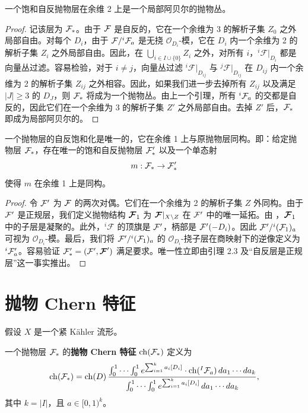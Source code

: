 \begin{lemma}
一个饱和自反抛物层在余维 2 上是一个局部阿贝尔的抛物丛。
\end{lemma}

\begin{proof}
记该层为 \(\mathcal{F}_{*}\)。由于 \(\mathcal{F}\) 是自反的，它在一个余维为 3 的解析子集 \(Z_0\) 之外局部自由。对每个 \(D_i\)，由于 \(\mathcal{F}/{}^i\mathcal{F}_a\) 是无挠 \(\mathcal O_{D_i}\)-模，它在 \(D_i\) 内一个余维为 2 的解析子集 \(Z_i\) 之外局部自由。因此，在 \(\bigcup_{i\in I\cup\{0\}} Z_i\) 之外，对所有 \(i\)，\({}^i\mathcal F|_{D_i}\) 都是向量丛过滤。容易检验，对于 \(i\neq j\)，向量丛过滤 \({}^i\mathcal F|_{D_{ij}}\) 与 \({}^j\mathcal F|_{D_{ij}}\) 在 \(D_{ij}\) 内一个余维为 2 的解析子集 \(Z_{ij}\) 之外相容。因此，如果我们进一步去掉所有 \(Z_{ij}\) 以及满足 \(|J|\ge 3\) 的 \(D_J\)，则 \(\mathcal{F}_{*}\) 将成为一个抛物丛。由上一个引理，所有 \({}^i\mathcal{F}_a\) 的交都是自反的，因此它们在一个余维为 3 的解析子集 \(Z'\) 之外局部自由。去掉 \(Z'\) 后，\(\mathcal{F}_{*}\) 即成为局部阿贝尔的。
\end{proof}

\begin{lemma}
一个抛物层的自反饱和化是唯一的，它在余维 1 上与原抛物层同构。即：给定抛物层 \(\mathcal{F}_{*}\)，存在唯一的饱和自反抛物层 \(\mathcal{F}'_{*}\) 以及一个单态射
\[
m:\mathcal{F}_*\to \mathcal{F}'_*
\]
使得 \(m\) 在余维 1 上是同构。
\end{lemma}

\begin{proof}
令 \(\mathcal{F}'\) 为 \(\mathcal{F}\) 的两次对偶。它们在一个余维为 2 的解析子集 \(Z\) 外同构。由于 \(\mathcal{F}'\) 是正规层，我们定义抛物结构 \(\boldsymbol{\mathcal{F}}_1\) 为 \(\boldsymbol{\mathcal{F}}|_{X\setminus Z}\) 在 \(\mathcal{F}'\) 中的唯一延拓。由 \cite[Theorem 2.2]{Si-Tr}，\(\boldsymbol{\mathcal{F}}_1\) 中的子层是凝聚的。此外，\({}^i\mathcal F\) 的顶旗是 \(\mathcal{F}'\)，柄部是 \(\mathcal{F}'(-D_i)\)。因此 \(\mathcal{F}'/{}^i(\mathcal F_1)_a\) 可视为 \(\mathcal O_{D_i}\)-模。最后，我们将 \(\mathcal{F}'/{}^i(\mathcal {\mathcal{F}}_1)_a\) 的 \(\mathcal O_{D_i}\)-挠子层在商映射下的逆像定义为 \({}^i\mathcal{F}'_a\)。容易验证 \(\mathcal{F}'_*=(\mathcal{F}',\boldsymbol{\mathcal{F}}')\) 满足要求。唯一性立即由引理 2.3 及“自反层是正规层”这一事实推出。
\end{proof}

\section{抛物 Chern 特征}

假设 \(X\) 是一个紧 Kähler 流形。

\begin{definition}
一个抛物层 \(\mathcal{F}_{*}\) 的\textbf{抛物 Chern 特征} \(\operatorname{ch}(\mathcal{F}_*)\) 定义为
\[
\operatorname{ch}(\mathcal{F}_*)=
\operatorname{ch}(D)\,
\frac{\int_0^1\cdots\int_0^1 e^{\sum_{i=1}^k a_i[D_i]}\cdot \operatorname{ch}({}^{I}\mathcal{F}_a)\,da_1\cdots da_k}
{\int_0^1\cdots\int_0^1 e^{\sum_{i=1}^k a_i[D_i]}\,da_1\cdots da_k},
\]
其中 \(k=|I|\)，且 \(a\in [0,1)^k\)。
\end{definition}


